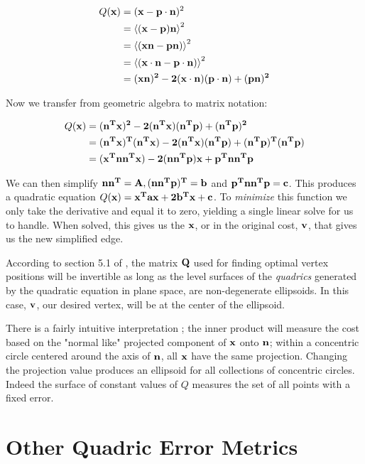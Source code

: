 \begin{align*}
    Q(\bf{x}) &= (\bf{x-p\cdot n})^2 \\
    &= \left \langle \bf{(x-p)n} \right \rangle^2 \\
    &=\left \langle \bf{(xn-pn)} \right \rangle^2 \\
    &=\left \langle \bf{(x\cdot n-p\cdot n)} \right \rangle^2 \\
    &=\bf{(xn)^2- 2(x\cdot n)(p\cdot n) + (pn)^2}
\end{align*}

Now we transfer from geometric algebra to matrix notation:

\begin{align*}
    Q(\bf{x}) &= \bf{(n^Tx)^2- 2(n^Tx)(n^Tp) + (n^Tp)^2} \\
&= \bf{(n^Tx)^T(n^Tx)- 2(n^Tx)(n^Tp) + (n^Tp)^T(n^Tp)} \\
&= \bf{(x^Tnn^Tx)- 2(nn^Tp)x + p^Tnn^Tp} 
\end{align*}

We can then simplify $\bf{nn^T = A, (nn^Tp)^T = b}$ and
$\bf{p^Tnn^Tp = c}$. This produces a quadratic equation
$Q(\bf{x}) = \bf{x^Tax + 2b^Tx + c}$. To \emph{minimize}
this function we only take the derivative and equal it to zero,
yielding a single linear solve for us to handle. When solved,
this gives us the $\bf{x}$, or in the original cost,
$\bf{v}$, that gives us the new simplified edge.

\spa

According to section 5.1 of \cite{LOD1}, the matrix $\bf{Q}$
used for finding optimal vertex positions will be invertible as long as the
level surfaces of the \emph{quadrics} generated by the quadratic equation
in plane space, are non-degenerate ellipsoids. In this case,
$\bf{v}$, our desired vertex, will be at the center of the ellipsoid.

\spa

There is a fairly intuitive interpretation \cite{LOD2}; the inner product will measure the cost
based on the "normal like" projected component of $\bf{x}$ onto $\bf{n}$;
within a concentric circle centered around the axis of $\bf{n}$, all $\bf{x}$
have the same projection. Changing the projection value produces an ellipsoid for all
collections of concentric circles. Indeed the surface of constant values of $Q$
measures the set of all points with a fixed error.

\section{Other Quadric Error Metrics}

